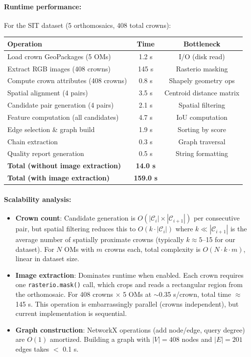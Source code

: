 \paragraph{Runtime performance:}
For the SIT dataset (5 orthomosaics, 408 total crowns):
\begin{center}
\begin{tabular}{lcc}
\toprule
Operation & Time & Bottleneck \\
\midrule
Load crown GeoPackages (5 OMs) & 1.2 s & I/O (disk read) \\
Extract RGB images (408 crowns) & 145 s & Rasterio masking \\
Compute crown attributes (408 crowns) & 0.8 s & Shapely geometry ops \\
Spatial alignment (4 pairs) & 3.5 s & Centroid distance matrix \\
Candidate pair generation (4 pairs) & 2.1 s & Spatial filtering \\
Feature computation (all candidates) & 4.7 s & IoU computation \\
Edge selection \& graph build & 1.9 s & Sorting by score \\
Chain extraction & 0.3 s & Graph traversal \\
Quality report generation & 0.5 s & String formatting \\
\midrule
\textbf{Total (without image extraction)} & \textbf{14.0 s} & \\
\textbf{Total (with image extraction)} & \textbf{159.0 s} & \\
\bottomrule
\end{tabular}
\end{center}

\paragraph{Scalability analysis:}
\begin{itemize}
    \item \textbf{Crown count}: Candidate generation is $O(|\mathcal{C}_i| \times |\mathcal{C}_{i+1}|)$ per consecutive pair, but spatial filtering reduces this to $O(k \cdot |\mathcal{C}_i|)$ where $k \ll |\mathcal{C}_{i+1}|$ is the average number of spatially proximate crowns (typically $k \approx 5$--15 for our dataset). For $N$ OMs with $m$ crowns each, total complexity is $O(N \cdot k \cdot m)$, linear in dataset size.
    
    \item \textbf{Image extraction}: Dominates runtime when enabled. Each crown requires one \texttt{rasterio.mask()} call, which crops and reads a rectangular region from the orthomosaic. For 408 crowns $\times$ 5 OMs at $\sim$0.35 s/crown, total time $\approx$ 145 s. This operation is embarrassingly parallel (crowns independent), but current implementation is sequential.
    
    \item \textbf{Graph construction}: NetworkX operations (add node/edge, query degree) are $O(1)$ amortized. Building a graph with $|V| = 408$ nodes and $|E| = 201$ edges takes $<$ 0.1 s.
\end{itemize}

